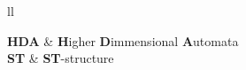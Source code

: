 
\begin{abbreviations}{ll} %

\textbf{HDA} & \textbf{H}igher \textbf{D}immensional \textbf{A}utomata\\
\textbf{ST} & \textbf{ST}-structure\\

\end{abbreviations}